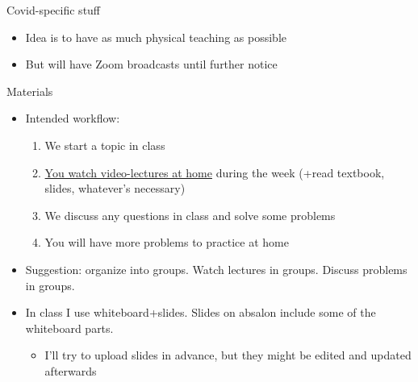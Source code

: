 \documentclass[english,10pt
,aspectratio=169
]{beamer}
\begin{document}
\begin{frame}{Covid-specific stuff}
	\begin{itemize}
		\item Idea is to have as much physical teaching as possible
		\item But will have Zoom broadcasts until further notice
	\end{itemize}
\end{frame}


\begin{frame}{Materials}
	\begin{itemize}
		\item Intended workflow: 
		\begin{enumerate}
			\item We start a topic in class
			\item \uline{You watch video-lectures at home} during the week (+read textbook, slides, whatever's necessary)
			\item We discuss any questions in class and solve some problems
			\item You will have more problems to practice at home
		\end{enumerate}
		\pause
		\item Suggestion: organize into groups. Watch lectures in groups. Discuss problems in groups.
		\pause
		\item In class I use whiteboard+slides. Slides on absalon include some of the whiteboard parts.
		\begin{itemize}
			\item I'll try to upload slides in advance, but they might be edited and updated afterwards
		\end{itemize}
	\end{itemize}
\end{frame}
\end{document}
